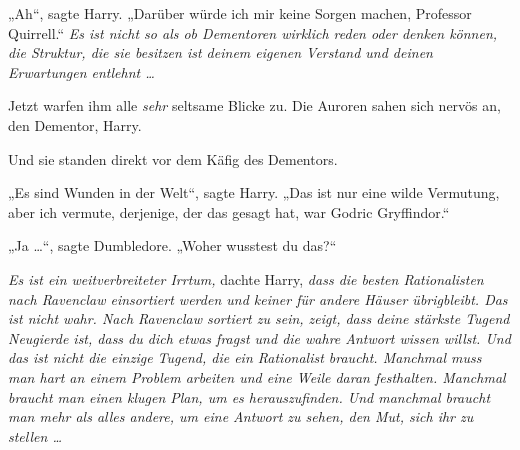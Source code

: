 „Ah“, sagte Harry.
„Darüber würde ich mir keine Sorgen machen, Professor Quirrell.“ \emph{Es ist nicht so als ob Dementoren wirklich reden oder denken können, die Struktur, die sie besitzen ist deinem eigenen Verstand und deinen Erwartungen entlehnt …}

Jetzt warfen ihm alle \emph{sehr} seltsame Blicke zu. Die Auroren sahen sich nervös an, den Dementor, Harry.

Und sie standen direkt vor dem Käfig des Dementors.

„Es sind Wunden in der Welt“, sagte Harry.
„Das ist nur eine wilde Vermutung, aber ich vermute, derjenige, der das gesagt hat, war Godric Gryffindor.“

„Ja …“, sagte Dumbledore.
„Woher wusstest du das?“

\emph{Es ist ein weitverbreiteter Irrtum,} dachte Harry, \emph{dass die besten Rationalisten nach Ravenclaw einsortiert werden und keiner für andere Häuser übrigbleibt. Das ist nicht wahr. Nach Ravenclaw sortiert zu sein, zeigt, dass deine stärkste Tugend Neugierde ist, dass du dich etwas fragst und die wahre Antwort wissen willst. Und das ist nicht die \emph{einzige} Tugend, die ein Rationalist braucht. Manchmal muss man hart an einem Problem arbeiten und eine Weile daran festhalten. Manchmal braucht man einen klugen Plan, um es herauszufinden. Und manchmal braucht man mehr als alles andere, um eine Antwort zu sehen, den Mut, sich ihr zu stellen …}


